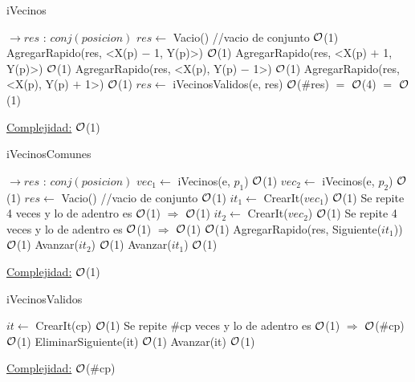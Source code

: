 \begin{Representacion}
\begin{Algoritmos}
	\begin{algorithm}[H]
		\caption{iVecinos}
		\begin{algorithmic}[1]
			 $\to res$ : $conj(posicion)$
				\State $res \gets$ Vacio() //vacio de conjunto \Comment $\mathcal{O}$(1)
				\State AgregarRapido(res, <X(p) $-$ 1, Y(p)>) \Comment $\mathcal{O}$(1)
				\State AgregarRapido(res, <X(p) $+$ 1, Y(p)>) \Comment $\mathcal{O}$(1)
				\State AgregarRapido(res, <X(p), Y(p) $-$ 1>) \Comment $\mathcal{O}$(1)
				\State AgregarRapido(res, <X(p), Y(p) $+$ 1>) \Comment $\mathcal{O}$(1)
				\State $res \gets$ iVecinosValidos(e, res) \Comment $\mathcal{O}$($\#$res) $=$ $\mathcal{O}$(4) $=$ $\mathcal{O}$(1)				
			\EndProcedure		
		\end{algorithmic}
		\underline{Complejidad:} $\mathcal{O}$(1)
	\end{algorithm}
		
	\begin{algorithm}[H]
		\caption{iVecinosComunes}
		\begin{algorithmic}[1]
			 $\to res$ : $conj(posicion)$
				\State $vec_1 \gets$ iVecinos(e, $p_1$) \Comment $\mathcal{O}$(1)
				\State $vec_2 \gets$ iVecinos(e, $p_2$) \Comment $\mathcal{O}$(1)
				\State $res \gets$ Vacio() //vacio de conjunto \Comment $\mathcal{O}$(1)
				\State $it_1 \gets$ CrearIt($vec_1$) \Comment $\mathcal{O}$(1)
				 \Comment Se repite 4 veces y lo de adentro es $\mathcal{O}$(1) $\Rightarrow$ $\mathcal{O}$(1)	
					\State $it_2 \gets$ CrearIt($vec_2$) \Comment $\mathcal{O}$(1)
					 \Comment Se repite 4 veces y lo de adentro es $\mathcal{O}$(1) $\Rightarrow$ $\mathcal{O}$(1)
						 \Comment $\mathcal{O}$(1)
							\State AgregarRapido(res, Siguiente($it_1$)) \Comment $\mathcal{O}$(1)
						\EndIf
						\State Avanzar($it_2$) \Comment $\mathcal{O}$(1)
					\EndWhile
					\State Avanzar($it_1$) \Comment $\mathcal{O}$(1)
				\EndWhile		
			\EndProcedure		
		\end{algorithmic}
		\underline{Complejidad:} $\mathcal{O}$(1)
	\end{algorithm}
			
	\begin{algorithm}[H]
		\caption{iVecinosValidos}
		\begin{algorithmic}[1]
				\State $it \gets$ CrearIt(cp) \Comment $\mathcal{O}$(1)
				 \Comment Se repite $\#$cp veces y lo de adentro es $\mathcal{O}$(1) $\Rightarrow$ $\mathcal{O}$($\#$cp)
					 \Comment $\mathcal{O}$(1)
						\State EliminarSiguiente(it) \Comment $\mathcal{O}$(1)
					\Else
						\State Avanzar(it) \Comment $\mathcal{O}$(1)
					\EndIf
				\EndWhile
			\EndProcedure		
		\end{algorithmic}
		\underline{Complejidad:} $\mathcal{O}$($\#$cp)
	\end{algorithm}
				

\end{Algoritmos}
\end{Representacion}

